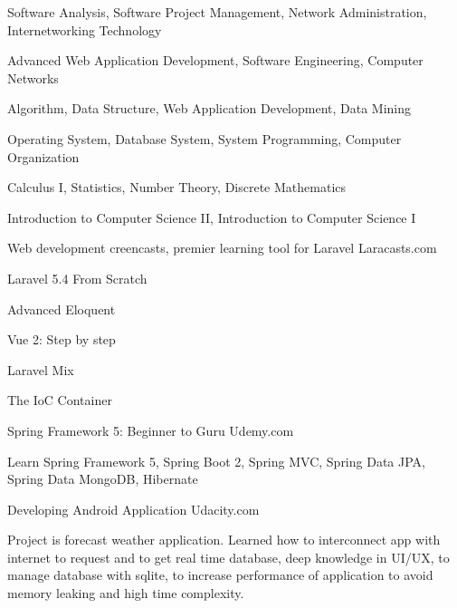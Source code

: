 \vspace{-1.0em}%
\begin{cventries}
  \cventry
    {}
    {}
    {}
    {}
    {
      \begin{cvitems}
      \vspace{-1em}%
        \item {Software Analysis, Software Project Management, Network Administration, Internetworking Technology}
        \item {Advanced Web Application Development, Software Engineering, Computer Networks}
        \item {Algorithm, Data Structure, Web Application Development, Data Mining}
        \item {Operating System, Database System, System Programming, Computer Organization}
        \item {Calculus I, Statistics, Number Theory, Discrete Mathematics}
        \item {Introduction to Computer Science II, Introduction to Computer Science I}
      \end{cvitems} 
    }
\end{cventries}
\vspace{-1.0em}%
\begin{cventries}
  \cventry
    {Web development creencasts, premier learning tool for Laravel}
    {Laracasts.com}
    {}
    {}
    {
      \begin{cvitems}
        \item {Laravel 5.4 From Scratch}
        \item {Advanced Eloquent}
        \item {Vue 2: Step by step}
        \item {Laravel Mix}
        \item {The IoC Container}
      \end{cvitems} 
    }
\end{cventries}
\vspace{-1.0em}%
\begin{cventries}
  \cventry
    {Spring Framework 5: Beginner to Guru}
    {Udemy.com}
    {}
    {}
    {
      \begin{cvitems}
        \item {Learn Spring Framework 5, Spring Boot 2, Spring MVC, Spring Data JPA, Spring
Data MongoDB, Hibernate}
      \end{cvitems} 
    }
\end{cventries}
\vspace{-1.0em}%
\begin{cventries}
  \cventry
    {Developing Android Application}
    {Udacity.com}
    {}
    {}
    {
      \begin{cvitems}
        \item {Project is forecast weather application. Learned how to interconnect app with internet to request and to get real time
database, deep knowledge in UI/UX, to manage database with sqlite, to increase
performance of application to avoid memory leaking and high time complexity.}
      \end{cvitems} 
    }
\end{cventries}


